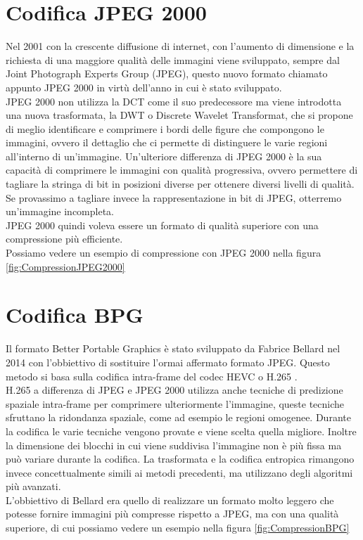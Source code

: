 \section{Codifica JPEG 2000}
Nel 2001 con la crescente diffusione di internet, con l’aumento di dimensione e la richiesta di una maggiore qualità delle immagini viene sviluppato, sempre dal Joint Photograph Experts Group (JPEG), questo nuovo formato chiamato appunto JPEG 2000 in virtù dell'anno in cui è stato sviluppato.\\
JPEG 2000 non utilizza la DCT come il suo predecessore ma viene introdotta una nuova trasformata, la DWT o Discrete Wavelet Transformat, che si propone di meglio identificare e comprimere i bordi delle figure che compongono le immagini, ovvero il dettaglio che ci permette di distinguere le varie regioni all'interno di un’immagine.
Un’ulteriore differenza di JPEG 2000 è la sua capacità di comprimere le immagini con qualità progressiva, ovvero permettere di tagliare la stringa di bit in posizioni diverse per ottenere diversi livelli di qualità. Se provassimo a tagliare invece la rappresentazione in bit di JPEG, otterremo un’immagine incompleta.\\
JPEG 2000 quindi voleva essere un formato di qualità superiore con una compressione più efficiente.\cite{952804}\\
Possiamo vedere un esempio di compressione con JPEG 2000 nella figura \ref{fig:CompressionJPEG2000}

\section{Codifica BPG}
Il formato Better Portable Graphics è stato sviluppato da Fabrice Bellard nel 2014 con l'obbiettivo di sostituire l’ormai affermato formato JPEG. Questo metodo si basa sulla codifica intra-frame del codec HEVC o H.265 \cite{BPGImageformat}.\\
H.265 a differenza di JPEG e JPEG 2000 utilizza anche tecniche di predizione spaziale intra-frame per comprimere ulteriormente l’immagine, queste tecniche sfruttano la ridondanza spaziale, come ad esempio le regioni omogenee. Durante la codifica le varie tecniche vengono provate e viene scelta quella migliore. Inoltre la dimensione dei blocchi in cui viene suddivisa l’immagine non è più fissa ma può variare durante la codifica.
La trasformata e la codifica entropica rimangono invece concettualmente simili ai metodi precedenti, ma utilizzano degli algoritmi più avanzati.\\
L’obbiettivo di  Bellard era quello di realizzare un formato molto leggero che potesse fornire immagini più compresse rispetto a JPEG, ma con una qualità superiore, di cui possiamo vedere un esempio nella figura \ref{fig:CompressionBPG}

